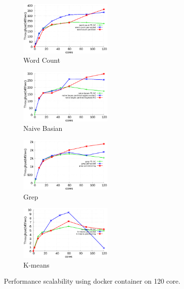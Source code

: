 \begin{figure}[tb]
    \centering
    \begin{subfigure}[b]{0.25\textwidth}
        \includegraphics[width=1.8in]{graph/wc_docker.eps}
        \caption{Word Count}
    \end{subfigure}%
    \begin{subfigure}[b]{0.25\textwidth}
        \includegraphics[width=1.8in]{graph/nb_docker.eps}
        \caption{Naive Basian}
    \end{subfigure}%
    \begin{subfigure}[b]{0.25\textwidth}
        \includegraphics[width=1.8in]{graph/grep_docker.eps}
        \caption{Grep}
    \end{subfigure}%
    \begin{subfigure}[b]{0.25\textwidth}
        \includegraphics[width=1.8in]{graph/kmeans_docker.eps}
        \caption{K-means}
    \end{subfigure}%
    \caption{Performance scalability using docker container on 120 core.}
    \label{fig:docker}
\end{figure}


